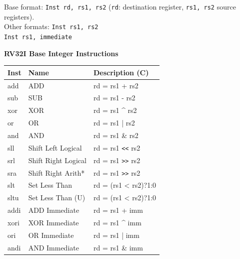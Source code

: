 \begin{tabbing}
    Base format: \quad \= \texttt{Inst rd, rs1, rs2} (\texttt{rd}: destination register, \texttt{rs1, rs2} source registers).\\
    Other formats: \> \texttt{Inst rs1, rs2}\\
    \> \texttt{Inst rs1, immediate}
\end{tabbing}

\begin{multicols}{2}
\textbf{RV32I Base Integer Instructions}\\
        \begin{tabular}
        {|l | l | l |} \hline
        \rm Inst & Name                    & \rm Description (C)          \\ \hline
        add      & ADD                     & rd = rs1 + rs2               \\
        sub      & SUB                     & rd = rs1 - rs2               \\
        xor      & XOR                     & rd = rs1 \^{} rs2            \\
        or       & OR                      & rd = rs1 | rs2               \\
        and      & AND                     & rd = rs1 \& rs2              \\
        sll      & Shift Left Logical      & rd = rs1 \verb|<<| rs2       \\
        srl      & Shift Right Logical     & rd = rs1 \verb|>>| rs2       \\
        sra      & Shift Right Arith*      & rd = rs1 \verb|>>| rs2       \\
        slt      & Set Less Than           & rd = (rs1 < rs2)?1:0         \\
        sltu     & Set Less Than (U)       & rd = (rs1 < rs2)?1:0         \\ \hline
        addi     & ADD Immediate           & rd = rs1 + imm               \\
        xori     & XOR Immediate           & rd = rs1 \^{} imm            \\
        ori      & OR Immediate            & rd = rs1 | imm               \\
        andi     & AND Immediate           & rd = rs1 \& imm              \\

\end{tabular}
\end{multicols}
